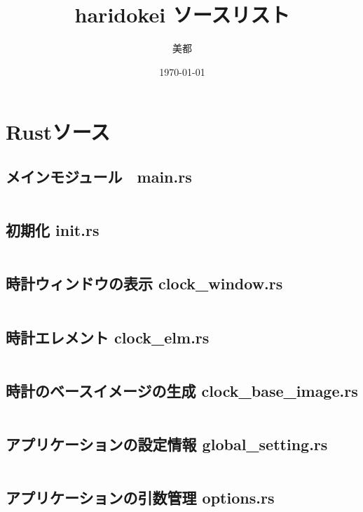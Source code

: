 \documentclass[paper=a4paper, fontsize=10pt, head_space=10mm, foot_space=17mm, gutter=17mm, line_length=185mm, twoside]{jlreq}
\title{haridokei ソースリスト}
\author{美都}
\date{\today}
\begin{document}
\maketitle
\tableofcontents
\clearpage

\section{Rustソース}
\subsection{メインモジュール　main.rs}
\inputminted[linenos, breaklines]{rust}{src/main.rs}
\clearpage
\subsection{初期化 init.rs}
\inputminted[linenos, breaklines]{rust}{src/init.rs}
\clearpage
\subsection{時計ウィンドウの表示 clock\_window.rs}
\inputminted[linenos, breaklines]{rust}{src/clock_window.rs}
\clearpage
\subsection{時計エレメント clock\_elm.rs}
\inputminted[linenos, breaklines]{rust}{src/clock_elm.rs}
\clearpage
\subsection{時計のベースイメージの生成 clock\_base\_image.rs}
\inputminted[linenos, breaklines]{rust}{src/clock_base_image.rs}
\clearpage
\subsection{アプリケーションの設定情報 global\_setting.rs}
\inputminted[linenos, breaklines]{rust}{src/global_setting.rs}
\clearpage
\subsection{アプリケーションの引数管理 options.rs}
\inputminted[linenos, breaklines]{rust}{src/options.rs}
\clearpage
\end{document}
